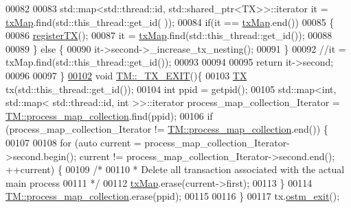 \begin{DoxyCode}
00082 
00083     std::map<std::thread::id, std::shared\_ptr<TX>>::iterator it = \hyperlink{class_t_m_a0333dfa193ea99d7626de74a2b932e9b_a0333dfa193ea99d7626de74a2b932e9b}{txMap}.find(std::this\_thread::get\_id(
      ));
00084     \textcolor{keywordflow}{if}(it == \hyperlink{class_t_m_a0333dfa193ea99d7626de74a2b932e9b_a0333dfa193ea99d7626de74a2b932e9b}{txMap}.end())
00085     \{
00086        \hyperlink{class_t_m_a26ea481c24d9aa3aebd6dafb7253376e_a26ea481c24d9aa3aebd6dafb7253376e}{registerTX}();
00087        it = \hyperlink{class_t_m_a0333dfa193ea99d7626de74a2b932e9b_a0333dfa193ea99d7626de74a2b932e9b}{txMap}.find(std::this\_thread::get\_id());
00088        
00089     \} \textcolor{keywordflow}{else} \{
00090         it->second->\_increase\_tx\_nesting();
00091     \}
00092     \textcolor{comment}{//it = txMap.find(std::this\_thread::get\_id());}
00093     
00094 
00095     \textcolor{keywordflow}{return} it->second;
00096 
00097 \}
\hypertarget{_t_m_8cpp_source.tex_l00102}{}\hyperlink{class_t_m_a5e2d1127f2429f2f524d25f430eade06_a5e2d1127f2429f2f524d25f430eade06}{00102} \textcolor{keywordtype}{void} \hyperlink{class_t_m_a5e2d1127f2429f2f524d25f430eade06_a5e2d1127f2429f2f524d25f430eade06}{TM::\_TX\_EXIT}()\{
00103     \hyperlink{class_t_x}{TX} tx(std::this\_thread::get\_id());
00104     \textcolor{keywordtype}{int} ppid = getpid();
00105     std::map<int, std::map< std::thread::id, int >>::iterator process\_map\_collection\_Iterator = 
      \hyperlink{class_t_m_a81c3bd28ad2343a620fa070f8ac186ca_a81c3bd28ad2343a620fa070f8ac186ca}{TM::process\_map\_collection}.find(ppid);
00106     \textcolor{keywordflow}{if} (process\_map\_collection\_Iterator != \hyperlink{class_t_m_a81c3bd28ad2343a620fa070f8ac186ca_a81c3bd28ad2343a620fa070f8ac186ca}{TM::process\_map\_collection}.end()) \{
00107 
00108         \textcolor{keywordflow}{for} (\textcolor{keyword}{auto} current = process\_map\_collection\_Iterator->second.begin(); current != 
      process\_map\_collection\_Iterator->second.end(); ++current) \{
00109             \textcolor{comment}{/*}
00110 \textcolor{comment}{             * Delete all transaction associated with the actual main process}
00111 \textcolor{comment}{             */}
00112             \hyperlink{class_t_m_a0333dfa193ea99d7626de74a2b932e9b_a0333dfa193ea99d7626de74a2b932e9b}{txMap}.erase(current->first);
00113         \}
00114         \hyperlink{class_t_m_a81c3bd28ad2343a620fa070f8ac186ca_a81c3bd28ad2343a620fa070f8ac186ca}{TM::process\_map\_collection}.erase(ppid);
00115 
00116     \}
00117     tx.\hyperlink{class_t_x_aa9739c5c2077454c779098db7baefc2b_aa9739c5c2077454c779098db7baefc2b}{ostm\_exit}();

\end{DoxyCode}

